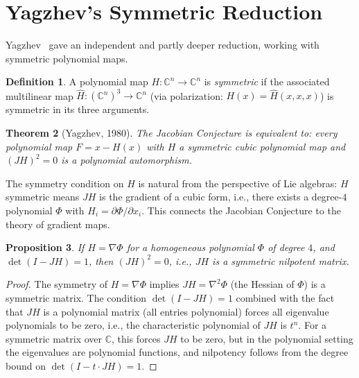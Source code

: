 \documentclass[12pt,a4paper]{amsart}
\newtheorem{theorem}{Theorem}[section]
\newtheorem{proposition}[theorem]{Proposition}
\theoremstyle{definition}
\newtheorem{definition}[theorem]{Definition}
\theoremstyle{remark}
\begin{document}
\section{Yagzhev's Symmetric Reduction}
\label{sec:yagzhev}

Yagzhev~\cite{Yag80} gave an independent and partly deeper reduction, working
with symmetric polynomial maps.

\begin{definition}
A polynomial map $H \colon \mathbb{C}^n \to \mathbb{C}^n$ is \emph{symmetric} if
the associated multilinear map $\hat{H} \colon (\mathbb{C}^n)^3 \to \mathbb{C}^n$
(via polarization: $H(x) = \hat{H}(x,x,x)$) is symmetric in its three arguments.
\end{definition}

\begin{theorem}[Yagzhev, 1980]\label{thm:yagzhev}
The Jacobian Conjecture is equivalent to: every polynomial map $F = x - H(x)$
with $H$ a symmetric cubic polynomial map and $(JH)^2 = 0$ is a polynomial
automorphism.
\end{theorem}

The symmetry condition on $H$ is natural from the perspective of Lie algebras:
$H$ symmetric means $JH$ is the gradient of a cubic form, i.e., there exists
a degree-$4$ polynomial $\Phi$ with $H_i = \partial \Phi / \partial x_i$.
This connects the Jacobian Conjecture to the theory of gradient maps.

\begin{proposition}
If $H = \nabla \Phi$ for a homogeneous polynomial $\Phi$ of degree $4$, and
$\det(I - JH) = 1$, then $(JH)^2 = 0$, i.e., $JH$ is a symmetric nilpotent matrix.
\end{proposition}

\begin{proof}
The symmetry of $H = \nabla \Phi$ implies $JH = \nabla^2 \Phi$ (the Hessian of $\Phi$)
is a symmetric matrix. The condition $\det(I - JH) = 1$ combined with the fact
that $JH$ is a polynomial matrix (all entries polynomial) forces all eigenvalue
polynomials to be zero, i.e., the characteristic polynomial of $JH$ is $t^n$.
For a symmetric matrix over $\mathbb{C}$, this forces $JH$ to be zero, but in
the polynomial setting the eigenvalues are polynomial functions, and nilpotency
follows from the degree bound on $\det(I - t \cdot JH) = 1$.
\end{proof}
\end{document}
